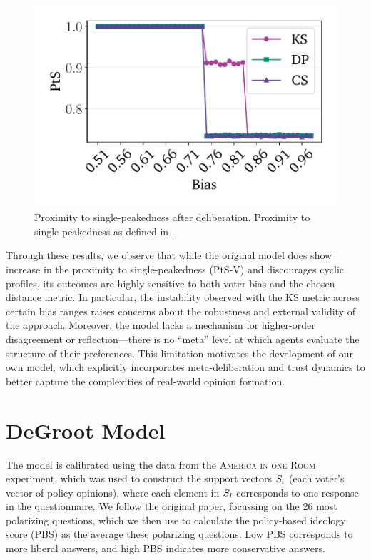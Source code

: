 \begin{figure}[htbp]
	\begin{minipage}{0.45\textwidth}
		\centering
		\vspace{-9pt}
		\includegraphics[width=\textwidth]{Figures/sp_proximity_PtS.pdf}
		\caption{Proximity to single-peakedness after deliberation. Proximity to single-peakedness as defined in .}
		\label{fig:rep_single_peaked}
	\end{minipage}
\end{figure}

Through these results, we observe that while the original model does show
increase in the proximity to single-peakedness (PtS-V) and discourages cyclic
profiles, its outcomes are highly sensitive to both voter bias and the chosen
distance metric. In particular, the instability observed with the KS metric
across certain bias ranges raises concerns about the robustness and external
validity of the approach. Moreover, the model lacks a mechanism for
higher-order disagreement or reflection—there is no ``meta'' level at which
agents evaluate the structure of their preferences. This limitation motivates
the development of our own model, which explicitly incorporates
meta-deliberation and trust dynamics to better capture the complexities of
real-world opinion formation.

\newpage
\section{DeGroot Model}\label{degroot_results}

The model is calibrated using the data from the \textsc{America in one Room}
experiment, which was used to construct the support vectors $S_i$ (each
voter's vector of policy opinions), where each element in $S_i$
corresponds to one response in the questionnaire. We follow the original paper,
focussing on the 26 most polarizing questions, which we then use to calculate
the policy-based ideology score (PBS) as the average these polarizing
questions. Low PBS corresponds to more liberal answers, and high PBS indicates
more conservative answers.


